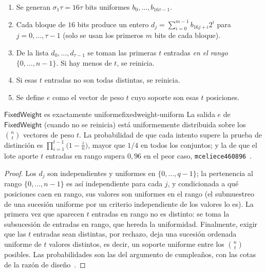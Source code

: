 \documentclass[11pt,a4paper,oneside]{report}
\begin{document}
\begin{enumerate}[leftmargin=1.8em,itemsep=2pt]
  \item Se generan $\sigma_1\tau=16\tau$ bits uniformes
        $b_0,\dots,b_{16\tau-1}$.
  \item Cada bloque de $16$ bits produce un entero
        $d_j=\sum_{i=0}^{m-1}b_{16j+i}2^i$ para $j=0,\dots,\tau-1$
        (solo se usan los primeros $m$ bits de cada bloque).
  \item De la lista $d_0,\dots,d_{\tau-1}$ se toman las primeras $t$
        entradas \emph{en el rango} $\{0,\dots,n-1\}$. Si hay menos de
        $t$, se reinicia.
  \item Si esas $t$ entradas no son todas distintas, se reinicia.
  \item Se define $e$ como el vector de peso $t$ cuyo soporte son esas
        $t$ posiciones.
\end{enumerate}

\begin{proposicion}{$\textsf{FixedWeight}$ es exactamente uniforme}{fixedweight-uniform}
La salida $e$ de $\textsf{FixedWeight}$ (cuando no se reinicia) está
uniformemente distribuida sobre los $\binom{n}{t}$ vectores de peso
$t$. La probabilidad de que cada intento supere la prueba de
distinción es $\prod_{i=1}^{t-1}\bigl(1-\tfrac{i}{n}\bigr)$, mayor que
$1/4$ en todos los conjuntos; y la de que el lote aporte $t$ entradas
en rango supera $0{,}96$ en el peor caso,
\texttt{mceliece460896}~\cite{cmrationale}.
\end{proposicion}

\begin{proof}
Los $d_j$ son independientes y uniformes en $\{0,\dots,q-1\}$; la
pertenencia al rango $\{0,\dots,n-1\}$ es así independiente para cada
$j$, y condicionada a qué posiciones caen en rango, sus valores son
uniformes en el rango (el submuestreo de una sucesión uniforme por un
criterio independiente de los valores lo es). La primera vez que
aparecen $t$ entradas en rango no es distinto: se toma la subsucesión
de entradas en rango, que hereda la uniformidad. Finalmente, exigir
que las $t$ entradas sean distintas, por rechazo, deja una sucesión
ordenada uniforme de $t$ valores distintos, es decir, un soporte
uniforme entre los $\binom{n}{t}$ posibles. Las probabilidades son las
del argumento de cumpleaños, con las cotas de la razón de
diseño~\cite{cmrationale}.
\end{proof}
\end{document}
